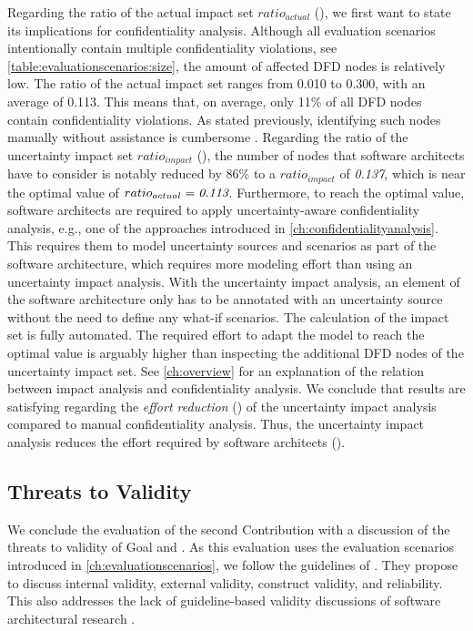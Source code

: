 Regarding the ratio of the actual impact set $ratio_{actual}$ (), we first want to state its implications for confidentiality analysis.
Although all evaluation scenarios intentionally contain multiple confidentiality violations, see \autoref{table:evaluationscenarios:size}, the amount of affected \ac{DFD} nodes is relatively low.
The ratio of the actual impact set ranges from 0.010 to 0.300, with an average of 0.113.
This means that, on average, only 11\% of all \ac{DFD} nodes contain confidentiality violations.
As stated previously, identifying such nodes manually without assistance is cumbersome \cite{seifermann_architectural_2022,seifermann_data-driven_2019}.
Regarding the ratio of the uncertainty impact set $ratio_{impact}$ (), the number of nodes that software architects have to consider is notably reduced by 86\% to a $ratio_{impact}$ of \emph{0.137}, which is near the optimal value of $ratio_{actual} = \emph{0.113}$.
Furthermore, to reach the optimal value, software architects are required to apply uncertainty-aware confidentiality analysis, e.g., one of the approaches introduced in \autoref{ch:confidentialityanalysis}.
This requires them to model uncertainty sources and scenarios as part of the software architecture, which requires more modeling effort than using an uncertainty impact analysis.
With the uncertainty impact analysis, an element of the software architecture only has to be annotated with an uncertainty source without the need to define any what-if scenarios.
The calculation of the impact set is fully automated.
The required effort to adapt the model to reach the optimal value is arguably higher than inspecting the additional \ac{DFD} nodes of the uncertainty impact set.
See \autoref{ch:overview} for an explanation of the relation between impact analysis and confidentiality analysis.
We conclude that results are satisfying regarding the \emph{effort reduction} () of the uncertainty impact analysis compared to manual confidentiality analysis.
Thus, the uncertainty impact analysis reduces the effort required by software architects (). 


\subsection{Threats to Validity}

We conclude the evaluation of the second Contribution  with a discussion of the threats to validity of Goal  and .
As this evaluation uses the evaluation scenarios introduced in \autoref{ch:evaluationscenarios}, we follow the guidelines of \textcite{runeson_guidelines_2009}.
They propose to discuss internal validity, external validity, construct validity, and reliability.
This also addresses the lack of guideline-based validity discussions of software architectural research \cite{konersmann_evaluation_2022}.


